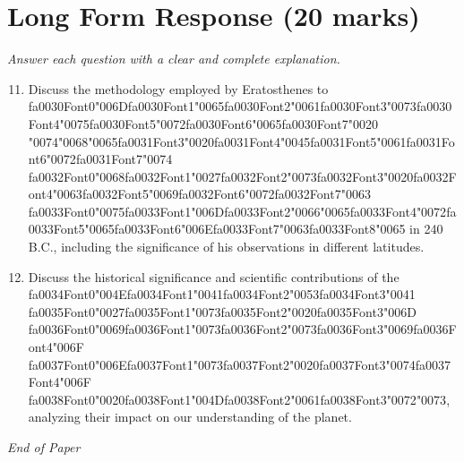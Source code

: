 \documentclass[12pt]{article}
\begin{document}
\begin{enumerate}[label=\arabic*.]
\end{enumerate}

\section*{Long Form Response (20 marks)}
\textit{Answer each question with a clear and complete explanation.}
\begin{enumerate}[label=\arabic*.]
\setcounter{enumi}{10}
\item Discuss the methodology employed by Eratosthenes to {\csname fa0030Font0\endcsname\char"006D}{\csname fa0030Font1\endcsname\char"0065}{\csname fa0030Font2\endcsname\char"0061}{\csname fa0030Font3\endcsname\char"0073}{\csname fa0030Font4\endcsname\char"0075}{\csname fa0030Font5\endcsname\char"0072}{\csname fa0030Font6\endcsname\char"0065}{\csname fa0030Font7\endcsname\char"0020} {\char"0074}{\char"0068}{\char"0065}{\csname fa0031Font3\endcsname\char"0020}{\csname fa0031Font4\endcsname\char"0045}{\csname fa0031Font5\endcsname\char"0061}{\csname fa0031Font6\endcsname\char"0072}{\csname fa0031Font7\endcsname\char"0074} {\csname fa0032Font0\endcsname\char"0068}{\csname fa0032Font1\endcsname\char"0027}{\csname fa0032Font2\endcsname\char"0073}{\csname fa0032Font3\endcsname\char"0020}{\csname fa0032Font4\endcsname\char"0063}{\csname fa0032Font5\endcsname\char"0069}{\csname fa0032Font6\endcsname\char"0072}{\csname fa0032Font7\endcsname\char"0063} {\csname fa0033Font0\endcsname\char"0075}{\csname fa0033Font1\endcsname\char"006D}{\csname fa0033Font2\endcsname\char"0066}{\char"0065}{\csname fa0033Font4\endcsname\char"0072}{\csname fa0033Font5\endcsname\char"0065}{\csname fa0033Font6\endcsname\char"006E}{\csname fa0033Font7\endcsname\char"0063}{\csname fa0033Font8\endcsname\char"0065} in 240 B.C.,
including the significance of his observations in different latitudes.
\item Discuss the historical significance and scientific contributions of the {\csname fa0034Font0\endcsname\char"004E}{\csname fa0034Font1\endcsname\char"0041}{\csname fa0034Font2\endcsname\char"0053}{\csname fa0034Font3\endcsname\char"0041} {\csname fa0035Font0\endcsname\char"0027}{\csname fa0035Font1\endcsname\char"0073}{\csname fa0035Font2\endcsname\char"0020}{\csname fa0035Font3\endcsname\char"006D}
{\csname fa0036Font0\endcsname\char"0069}{\csname fa0036Font1\endcsname\char"0073}{\csname fa0036Font2\endcsname\char"0073}{\csname fa0036Font3\endcsname\char"0069}{\csname fa0036Font4\endcsname\char"006F} {\csname fa0037Font0\endcsname\char"006E}{\csname fa0037Font1\endcsname\char"0073}{\csname fa0037Font2\endcsname\char"0020}{\csname fa0037Font3\endcsname\char"0074}{\csname fa0037Font4\endcsname\char"006F} {\csname fa0038Font0\endcsname\char"0020}{\csname fa0038Font1\endcsname\char"004D}{\csname fa0038Font2\endcsname\char"0061}{\csname fa0038Font3\endcsname\char"0072}{\char"0073}, analyzing their impact on our understanding of the planet.
\end{enumerate}

\vfill
\noindent\textit{End of Paper}
\end{document}
